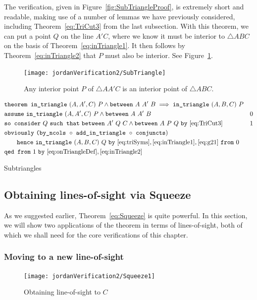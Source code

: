 The verification, given in Figure~\ref{fig:SubTriangleProof}, is extremely short and readable, making use of a number of lemmas we have previously considered, including Theorem~\ref{eq:TriCut3} from the last subsection. With this theorem, we can put a point $Q$ on the line $A'C$, where we know it must be interior to $\triangle ABC$ on the basis of Theorem~\ref{eq:inTriangle1}. It then follows by Theorem~\ref{eq:inTriangle2} that $P$ must also be interior. See Figure~\ref{fig:SubTriangle}.

\begin{figure}
\centering\texttt{[image: jordanVerification2/SubTriangle]}
\caption{Any interior point $P$ of $\triangle AA'C$ is an interior point of $\triangle ABC$.}
\label{fig:SubTriangle}
\end{figure}

\begin{boxedfigure}
\small
\begin{align*}
&\code{theorem }\code{in\_triangle}\ (A,A',C)\ P \wedge \between{A}{A'}{B} 
                  \implies \code{in\_triangle}\ (A,B,C)\ P\\
&\code{assume}\ \code{in\_triangle}\ (A,A',C)\ P \wedge \between{A}{A'}{B} & 0 \\
&\code{so consider}\ Q\ \code{such that}\ \between{A'}{Q}{C} \wedge \between{A}{P}{Q} \ \code{by}\ \eqref{eq:TriCut3} & 1\\
&\code{obviously}\ \code{(by\_ncols}\ \circ\ \code{add\_in\_triangle}\ \circ\ \code{conjuncts})\\
&\qquad \code{hence}\ \code{in\_triangle}\ (A,B,C)\ Q\ \code{by}\ \eqref{eq:triSyms},\eqref{eq:inTriangle1},\eqref{eq:g21}\ \code{from}\ 0\\
&\code{qed from}\ 1\ \code{by}\ \eqref{eq:onTriangleDef},\eqref{eq:inTriangle2}
\end{align*}
\caption{Subtriangles}
\label{fig:SubTriangleProof}
\end{boxedfigure}

\subsection{Obtaining lines-of-sight via Squeeze}\label{sec:SqueezeEye}
As we suggested earlier, Theorem~\ref{eq:Squeeze} is quite powerful. In this section, we will show two applications of the theorem in terms of lines-of-sight, both of which we shall need for the core verifications of this chapter. 

\subsubsection{Moving to a new line-of-sight}\label{sec:MoveToNew}
\begin{figure}
\centering\texttt{[image: jordanVerification2/Squeeze1]}
\caption{Obtaining line-of-sight to $C$}
\label{fig:Squeeze1}
\end{figure}

